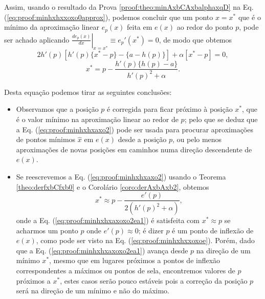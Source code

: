 \begin{myproofT}
Assim, usando o resultado da Prova \ref{proof:theo:minAxbCAxbalphaxqD} na Eq. (\ref{eq:proof:minhxhxxoxo0approx}), 
podemos concluir que um ponto $x=x^*$ que é 
o mínimo da aproximação linear $e_p(x)$ feita em $e(x)$ ao redor do ponto $p$,
pode ser achado aplicando $\left. \frac{d e_p(x)}{d x }\right|_{x=x^*} \equiv e_{p}'(x^*) =0$,
de modo que obtemos
\begin{equation}\label{eq:proof:minhxhxaxo2a}
 2 h'(p)[h'(p)\{x^*-p\} -\{a-h(p)\}] + \alpha [x^*-p] = 0,
\end{equation} 
\begin{equation}\label{eq:proof:minhxhxaxo2}
x^* = p - \frac{h'(p)\{h(p)-a\}}{ h'(p)^2+\alpha}.
\end{equation} 








Desta equação podemos tirar as seguintes conclusões:
\begin{itemize}

\item Observamos que a posição $p$ é corregida para ficar próximo à posição $x^*$, 
que é o valor mínimo na aproximação linear ao redor de $p$;
pelo que se deduz que a Eq. (\ref{eq:proof:minhxhxaxo2})
pode ser usada para procurar aproximações de pontos mínimos $\hat{x}$ em $e(x)$ desde a posição $p$,
ou pelo menos aproximações de novas posições em caminhos numa direção descendente de $e(x)$.

\item Se reescrevemos a Eq. (\ref{eq:proof:minhxhxaxo2}) usando o Teorema \ref{theo:derfxbCfxb0}
e o Corolário \ref{coro:derAxbAxb2},
obtemos
\begin{equation}\label{eq:proof:minhxhxaxoxo2ea1}
x^* \approx p - \frac{ e'(p)}{2(h'(p)^2+\alpha)},
\end{equation}
onde a Eq. (\ref{eq:proof:minhxhxaxoxo2ea1}) é satisfeita 
com $x^* \approx p$
se acharmos um  ponto $p$ onde  
$e'(p)\approx 0$; 
é dizer $p$ é um ponto de inflexão de $e(x)$, como pode ser visto na Eq. (\ref{eq:proof:minhxhxxoxoe}).
Porém, dado que a Eq. (\ref{eq:proof:minhxhxaxoxo2ea1}) avança desde $p$ na direção de um mínimo $x^*$, 
mesmo que em lugares próximos a pontos de inflexão correspondentes a máximos ou pontos de sela,
encontremos valores de $p$ próximos a $x^*$,
 estes casos serão pouco estáveis pois
a correção da posição $p$ será na direção de um mínimo e não do máximo.


\end{itemize}
\end{myproofT}

